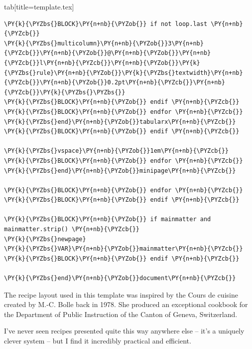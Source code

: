 \documentclass[a4paper,twoside]{article}
\begin{document}
\begin{tsdiv}{tab}[title=template.tex]
\begin{tscode}[lang=tex, engine=pygments]
\begin{Verbatim}[commandchars=\\\{\},breaklines, breakanywhere, commandchars=\\\{\}]
\PY{k}{\PYZbs{}BLOCK}\PY{n+nb}{\PYZob{}} if not loop.last \PY{n+nb}{\PYZcb{}}
\PY{k}{\PYZbs{}multicolumn}\PY{n+nb}{\PYZob{}}3\PY{n+nb}{\PYZcb{}}\PY{n+nb}{\PYZob{}}@\PY{n+nb}{\PYZob{}}\PY{n+nb}{\PYZcb{}}l\PY{n+nb}{\PYZcb{}}\PY{n+nb}{\PYZob{}}\PY{k}{\PYZbs{}rule}\PY{n+nb}{\PYZob{}}\PY{k}{\PYZbs{}textwidth}\PY{n+nb}{\PYZcb{}}\PY{n+nb}{\PYZob{}}0.2pt\PY{n+nb}{\PYZcb{}}\PY{n+nb}{\PYZcb{}}\PY{k}{\PYZbs{}\PYZbs{}}
\PY{k}{\PYZbs{}BLOCK}\PY{n+nb}{\PYZob{}} endif \PY{n+nb}{\PYZcb{}}
\PY{k}{\PYZbs{}BLOCK}\PY{n+nb}{\PYZob{}} endfor \PY{n+nb}{\PYZcb{}}
\PY{k}{\PYZbs{}end}\PY{n+nb}{\PYZob{}}tabularx\PY{n+nb}{\PYZcb{}}
\PY{k}{\PYZbs{}BLOCK}\PY{n+nb}{\PYZob{}} endif \PY{n+nb}{\PYZcb{}}

\PY{k}{\PYZbs{}vspace}\PY{n+nb}{\PYZob{}}1em\PY{n+nb}{\PYZcb{}}
\PY{k}{\PYZbs{}BLOCK}\PY{n+nb}{\PYZob{}} endfor \PY{n+nb}{\PYZcb{}}
\PY{k}{\PYZbs{}end}\PY{n+nb}{\PYZob{}}minipage\PY{n+nb}{\PYZcb{}}

\PY{k}{\PYZbs{}BLOCK}\PY{n+nb}{\PYZob{}} endfor \PY{n+nb}{\PYZcb{}}
\PY{k}{\PYZbs{}BLOCK}\PY{n+nb}{\PYZob{}} endif \PY{n+nb}{\PYZcb{}}

\PY{k}{\PYZbs{}BLOCK}\PY{n+nb}{\PYZob{}} if mainmatter and mainmatter.strip() \PY{n+nb}{\PYZcb{}}
\PY{k}{\PYZbs{}newpage}
\PY{k}{\PYZbs{}VAR}\PY{n+nb}{\PYZob{}}mainmatter\PY{n+nb}{\PYZcb{}}
\PY{k}{\PYZbs{}BLOCK}\PY{n+nb}{\PYZob{}} endif \PY{n+nb}{\PYZcb{}}

\PY{k}{\PYZbs{}end}\PY{n+nb}{\PYZob{}}document\PY{n+nb}{\PYZcb{}}
\end{Verbatim}
\end{tscode}
\end{tsdiv}
\begin{tscallout}[kind=note]
The recipe layout used in this template was inspired by the Cours de cuisine created by M.-C. Bolle back in 1978. She produced an exceptional cookbook for the Department of Public Instruction of the Canton of Geneva, Switzerland.

I've never seen recipes presented quite this way anywhere else -- it's a uniquely clever system -- but I find it incredibly practical and efficient.
\end{tscallout}
\end{document}
